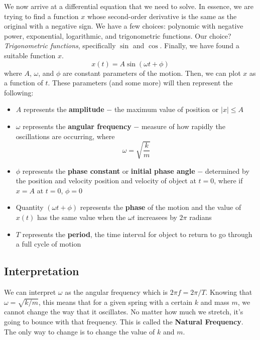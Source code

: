 We now arrive at a differential equation that we need to solve. In essence, we are trying to 
find a function $x$ whose second-order derivative is the same as the original with a negative sign.
We have a few choices: polynomic with negative power, exponential, logarithmic, and trigonometric
functions. Our choice? \textit{Trigonometric functions}, specifically $\sin$ and $\cos$. Finally,
we have found a suitable function $x$.
\begin{equation}\label{15.6}
    x(t) = A\sin(\omega t + \phi)
\end{equation} 
where $A$, $\omega$, and $\phi$ are constant parameters of the motion. Then, we can plot $x$ as
a function of $t$. These parameters (and some more) will then represent the following:
\begin{itemize}
    \item $A$ represents the \textbf{amplitude} $-$ the maximum value of position or $|x|\leq A$
    \item $\omega$ represents the \textbf{angular frequency} $-$ measure of how rapidly the oscillations
        are occurring, where \begin{equation}\label{15.9}
            \omega = \sqrt{\frac{k}{m}}
        \end{equation}
    \item $\phi$ represents the \textbf{phase constant} or \textbf{initial phase angle} $-$
        determined by the position and velocity position and velocity of object at $t=0$, where
        if $x=A$ at $t=0$, $\phi = 0$
    \item Quantity $(\omega t + \phi)$ represents the \textbf{phase} of the motion and the value of
        $x(t)$ has the same value when the $\omega t$ increasees by $2\pi$ radians
    \item $T$ represents the \textbf{period}, the time interval for object to return to go through
        a full cycle of motion
\end{itemize}


\subsection{Interpretation}

We can interpret $\omega$ as the angular frequency which is $2\pi f = 2\pi / T$.
Knowing that $\omega = \sqrt{k/m}$, this means that for a given spring with a certain $k$ and mass $m$,
we cannot change the way that it oscillates. No matter how much we stretch, it's going to bounce with
that frequency. This is called the \textbf{Natural Frequency}. The only way to change is to change 
the value of $k$ and $m$.

